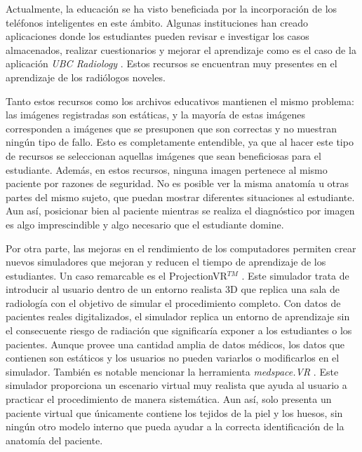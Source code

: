Actualmente, la educación se ha visto beneficiada por la incorporación de los teléfonos inteligentes en este ámbito. Algunas instituciones han creado aplicaciones donde los estudiantes pueden revisar e investigar los casos almacenados, realizar cuestionarios y mejorar el aprendizaje como es el caso de la aplicación \emph{UBC Radiology} \cite{Spouge2017}. Estos recursos se encuentran muy presentes en el aprendizaje de los radiólogos noveles.

Tanto estos recursos como los archivos educativos mantienen el mismo problema: las imágenes registradas son estáticas, y la mayoría de estas imágenes corresponden a imágenes que se presuponen que son correctas y no muestran ningún tipo de fallo. Esto es completamente entendible, ya que al hacer este tipo de recursos se seleccionan aquellas imágenes que sean beneficiosas para el estudiante. Además, en estos recursos, ninguna imagen pertenece al mismo paciente por razones de seguridad. No es posible ver la misma anatomía u otras partes del mismo sujeto, que puedan mostrar diferentes situaciones al estudiante. Aun así, posicionar bien al paciente mientras se realiza el diagnóstico por imagen es algo imprescindible y algo necesario que el estudiante domine. 

Por otra parte, las mejoras en el rendimiento de los computadores permiten crear nuevos simuladores que mejoran y reducen el tiempo de aprendizaje de los estudiantes. Un caso remarcable es el  ProjectionVR$^{TM}$ \cite{shanahan2016student}. Este simulador trata de introducir al usuario dentro de un entorno realista 3D que replica una sala de radiología con el objetivo de simular el procedimiento completo. Con datos de pacientes reales digitalizados, el simulador replica un entorno de aprendizaje sin el consecuente riesgo de radiación que significaría exponer a los estudiantes o los pacientes. Aunque provee una cantidad amplia de datos médicos, los datos que contienen son estáticos y los usuarios no pueden variarlos o modificarlos en el simulador. También es notable mencionar la herramienta \emph{medspace.VR} \cite{medspace}. Este simulador proporciona un escenario virtual muy realista que ayuda al usuario a practicar el procedimiento de manera sistemática. Aun así, solo presenta un paciente virtual que únicamente contiene los tejidos de la piel y los huesos, sin ningún otro modelo interno que pueda ayudar a la correcta identificación de la anatomía del paciente.

